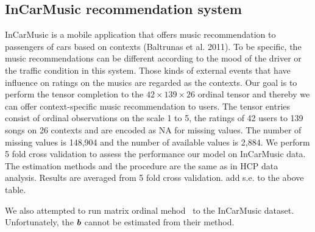 \documentclass{article}
\theoremstyle{plain}
\theoremstyle{definition}
\begin{document}
\subsection{InCarMusic recommendation system}
InCarMusic is a mobile application that offers music recommendation to passengers of cars based on contexts (Baltrunas et al. 2011). To be specific, the music recommendations can be different according to the mood of the driver or the traffic condition in this system. Those kinds of external events that have influence on ratings on the musics are regarded as the contexts. Our goal is to perform the tensor completion to the $42\times 139\times 26$ ordinal tensor and thereby we can offer context-specific music recommendation to users. The tensor entries consist of ordinal observations on the scale 1 to 5, the ratings of 42 users to 139 songs on 26 contexts and are encoded as NA for missing values. The number of missing values is 148,904 and the number of available values is 2,884.
We perform 5 fold cross validation to assess the performance our model on InCarMusic data. The estimation methods and the procedure are the same as in HCP data analysis.
Results are averaged from 5 fold cross validation. {\color{red} add s.e. to the above table.}

\begin{table}[H]
\caption{Comparison of tensor completion performance on InCarMusic dataset.}
\end{table}

We also attempted to run matrix ordinal mehod~\citep{bhaskar2016probabilistic} to the InCarMusic dataset. Unfortunately, the $\bm{b}$ cannot be estimated from their method.



\end{document}
